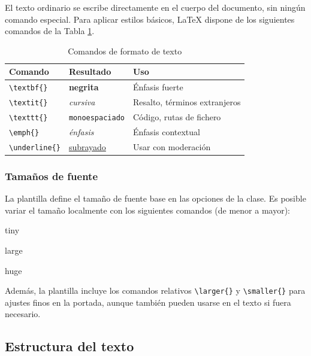 El texto ordinario se escribe directamente en el cuerpo del documento, sin ningún comando especial. Para aplicar estilos básicos, \LaTeX{} dispone de los siguientes comandos de la Tabla \ref{tab:formato}.

\begin{table}[htbp]
\caption{Comandos de formato de texto}\label{tab:formato}
\vspace{0.1cm}
\centering
\begin{tabular}{lll}
\hline
\textbf{Comando} & \textbf{Resultado} & \textbf{Uso} \\
\hline
\lstinline|\textbf{}| & \textbf{negrita} & Énfasis fuerte \\
\lstinline|\textit{}| & \textit{cursiva} & Resalto, términos extranjeros \\
\lstinline|\texttt{}| & \texttt{monoespaciado} & Código, rutas de fichero \\
\lstinline|\emph{}|   & \emph{énfasis}   & Énfasis contextual \\
\lstinline|\underline{}| & \underline{subrayado} & Usar con moderación \\[0.05cm] 
\hline
\end{tabular}
\end{table}

\subsubsection*{Tamaños de fuente}

La plantilla define el tamaño de fuente base en las opciones de la clase. Es posible variar el tamaño localmente con los siguientes comandos (de menor a mayor):

\begin{center}
{\tiny tiny}     

{\large large}   

{\huge huge} 
\end{center}

Además, la plantilla incluye los comandos relativos \lstinline|\larger{}| y \lstinline|\smaller{}| para ajustes finos en la portada, aunque también pueden usarse en el texto si fuera necesario.

\subsection{Estructura del texto}

